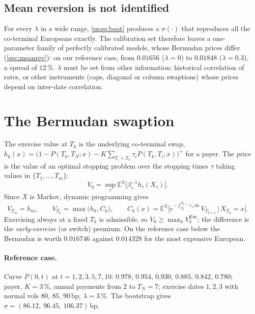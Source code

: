\documentclass[11pt,a4paper]{article}
\theoremstyle{definition}
\theoremstyle{remark}
\newcommand{\E}{\mathbb{E}}
\newcommand{\Q}{\mathbb{Q}}
\newcommand{\dd}{\,\mathrm{d}}
\begin{document}
\subsection{Mean reversion is not identified}
For every $\lambda$ in a wide range, \cref{prop:boot} produces a $\sigma(\cdot)$ that reproduces all the co-terminal Europeans
exactly. The calibration set therefore leaves a one-parameter family of perfectly calibrated models, whose Bermudan prices
differ (\cref{sec:meanrev}): on our reference case, from $0.01656$ ($\lambda=0$) to $0.01848$ ($\lambda=0.3$), a spread of
$12\,\%$. $\lambda$ must be set from other information: historical correlation of rates, or other instruments (caps, diagonal or
column swaptions) whose prices depend on inter-date correlation.

\section{The Bermudan swaption}\label{sec:bermudan}
The exercise value at $T_k$ is the underlying co-terminal swap, $h_k(x)=\big(1-P(T_k,T_N;x)-K\sum_{T_i>T_k}\tau_iP(T_k,T_i;x)\big)^+$
for a payer. The price is the value of an optimal stopping problem over the stopping times $\tau$ taking values in
$\{T_1,\dots,T_m\}$:
\begin{equation}
  V_0=\sup_\tau\E^\Q\big[\beta_\tau^{-1}h_\tau(X_\tau)\big].
\end{equation}
Since $X$ is Markov, dynamic programming gives
\begin{equation}\label{eq:dp}
  V_{T_m}=h_m,\qquad V_{T_k}=\max\big(h_k,C_k\big),\qquad
  C_k(x)=\E^\Q\Big[e^{-\int_{T_k}^{T_{k+1}}r_s\dd s}\,V_{T_{k+1}}\,\Big|\,X_{T_k}=x\Big].
\end{equation}
Exercising always at a fixed $T_k$ is admissible, so $V_0\ge\max_kV^{\mathrm{Eur}}_k$; the difference is the
\emph{early-exercise} (or switch) premium. On the reference case below the Bermudan is worth $0.016746$ against
$0.014328$ for the most expensive European.

\paragraph{Reference case.} Curve $P(0,t)$ at $t=1,2,3,5,7,10$: $0.978$, $0.954$, $0.930$, $0.885$, $0.842$, $0.780$; payer, $K=3\,\%$,
annual payments from $2$ to $T_N=7$; exercise dates $1,2,3$ with normal vols $80$, $85$, $90$\,bp; $\lambda=3\,\%$. The
bootstrap gives $\sigma=(86.12,\ 96.45,\ 106.37)$\,bp.
\end{document}
